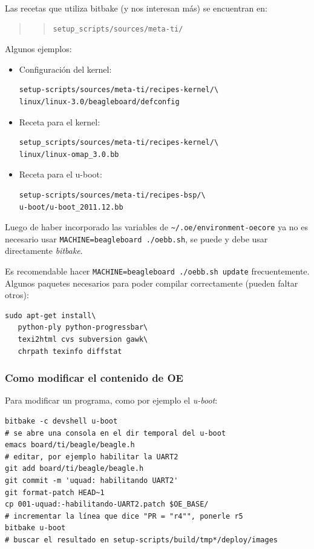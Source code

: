 \documentclass[main]{subfiles}
\begin{document}
Las recetas que utiliza bitbake (y nos interesan más) se encuentran en:
\begin{quote}
\begin{quote}
\begin{verbatim}
setup_scripts/sources/meta-ti/
\end{verbatim}
\end{quote}
\end{quote}
Algunos ejemplos:
\begin{itemize}
\item Configuración del kernel:
\begin{verbatim}
setup-scripts/sources/meta-ti/recipes-kernel/\
linux/linux-3.0/beagleboard/defconfig
\end{verbatim}
\item Receta para el kernel:
\begin{verbatim}
setup_scripts/sources/meta-ti/recipes-kernel/\
linux/linux-omap_3.0.bb
\end{verbatim}
\item Receta para el u-boot:
\begin{verbatim}
setup-scripts/sources/meta-ti/recipes-bsp/\
u-boot/u-boot_2011.12.bb
\end{verbatim}
\end{itemize}

Luego de haber incorporado las variables de \verb+~/.oe/environment-oecore+ ya no es necesario usar \verb+MACHINE=beagleboard ./oebb.sh+, se puede y debe usar directamente \textit{bitbake}.

Es recomendable hacer \verb+MACHINE=beagleboard ./oebb.sh update+ frecuentemente.
Algunos paquetes necesarios para poder compilar correctamente (pueden faltar otros):
\begin{verbatim}
sudo apt-get install\
   python-ply python-progressbar\
   texi2html cvs subversion gawk\
   chrpath texinfo diffstat
\end{verbatim}

\subsubsection{Como modificar el contenido de OE}
\label{sec:codigo:como-modificar-el-contenido-de-oe}

Para modificar un programa, como por ejemplo el \textit{u-boot}:
\begin{verbatim}
bitbake -c devshell u-boot
# se abre una consola en el dir temporal del u-boot
emacs board/ti/beagle/beagle.h
# editar, por ejemplo habilitar la UART2
git add board/ti/beagle/beagle.h
git commit -m 'uquad: habilitando UART2'
git format-patch HEAD~1
cp 001-uquad:-habilitando-UART2.patch $OE_BASE/
# incrementar la línea que dice "PR = "r4"", ponerle r5
bitbake u-boot
# buscar el resultado en setup-scripts/build/tmp*/deploy/images
\end{verbatim}
\end{document}
